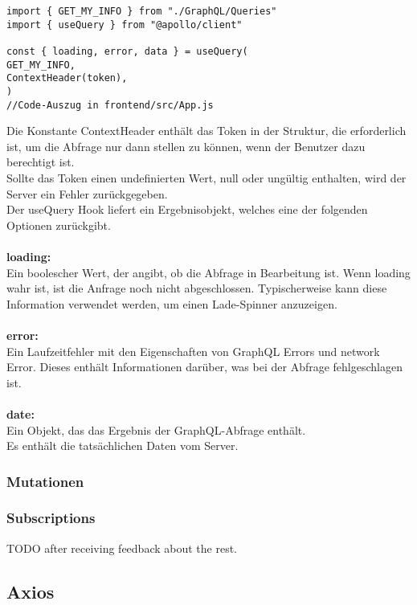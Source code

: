 \begin{lstlisting}
import { GET_MY_INFO } from "./GraphQL/Queries"
import { useQuery } from "@apollo/client"

const { loading, error, data } = useQuery(
GET_MY_INFO,
ContextHeader(token),
)
//Code-Auszug in frontend/src/App.js

\end{lstlisting}
Die Konstante ContextHeader enthält das Token in der Struktur, die erforderlich ist, um die Abfrage nur dann stellen zu können, wenn der Benutzer dazu berechtigt ist.
\\
Sollte das Token einen undefinierten Wert, null oder ungültig enthalten, wird der Server ein Fehler zurückgegeben.
\\
Der useQuery Hook liefert ein Ergebnisobjekt, welches eine der folgenden Optionen zurückgibt.
\\\\
\textbf{loading:}\\
Ein boolescher Wert, der angibt, ob die Abfrage in Bearbeitung ist.
Wenn loading wahr ist, ist die Anfrage noch nicht abgeschlossen. Typischerweise kann diese Information verwendet werden, um einen Lade-Spinner anzuzeigen.
\\\\
\textbf{error:}\\
Ein Laufzeitfehler mit den Eigenschaften von GraphQL Errors und network Error.
Dieses enthält Informationen darüber, was bei der Abfrage fehlgeschlagen  ist.
\\\\
\textbf{date:}\\
Ein Objekt, das das Ergebnis der GraphQL-Abfrage enthält.
\\Es enthält die tatsächlichen Daten vom Server.
\\
\newpage

\subsubsection{Mutationen}
\subsubsection{Subscriptions}

TODO after receiving feedback about the rest.

\newpage
\subsection{Axios}
\begin{comment}
\begin{quote}
  Axios ist ein Promise-basierter HTTP-Client für node.js und den browser. Auf der Server-Seite wir das modul HTTP verwendet, während im Browser XMLHttpRequests (ajax) ausgeführt werden.
\end{quote}\footnote{Vgl. u.a. \cite{AX1}}
\end{comment}

